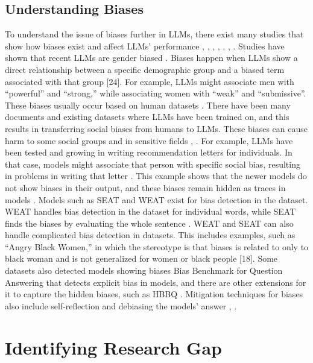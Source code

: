 \documentclass[twocolumn]{article}
\begin{document}
\subsection{Understanding Biases}
To understand the issue of biases further in LLMs, there exist many studies that show how biases exist and affect LLMs’ performance \cite{gallegos2024selfdebiasing}, \cite{may2019measuring}, \cite{scherrer2023gender}, \cite{thong2020biasaware}, \cite{anderson2024bias}, \cite{anantaprayoon2025intentaware}, \cite{pan2025beneath}. Studies have shown that recent LLMs are gender biased \cite{scherrer2023gender}. Biases happen when LLMs show a direct relationship between a specific demographic group and a biased term associated with that group [24]. For example, LLMs might associate men with “powerful” and “strong,” while associating women with “weak” and “submissive”. These biases usually occur based on human datasets \cite{gallegos2024selfdebiasing}. There have been many documents and existing datasets where LLMs have been trained on, and this results in transferring social biases from humans to LLMs. These biases can cause harm to some social groups and in sensitive fields \cite{scherrer2023gender}, \cite{pan2025beneath}. For example, LLMs have been tested and growing in writing recommendation letters for individuals. In that case, models might associate that person with specific social bias, resulting in problems in writing that letter \cite{pan2025beneath}. This example shows that the newer models do not show biases in their output, and these biases remain hidden as traces in models \cite{pan2025beneath}. Models such as SEAT and WEAT exist for bias detection in the dataset. WEAT handles bias detection in the dataset for individual words, while SEAT finds the biases by evaluating the whole sentence \cite{may2019measuring}. WEAT and SEAT can also handle complicated bias detection in datasets. This includes examples, such as “Angry Black Women,” in which the stereotype is that biases is related to only to black woman and is not generalized for women or black people [18]. Some datasets also detected models showing biases Bias Benchmark for Question Answering that detects explicit bias in models, and there are other extensions for it to capture the hidden biases, such as HBBQ \cite{pan2025beneath}. Mitigation techniques for biases also include self-reflection and debiasing the models’ answer \cite{gallegos2024selfdebiasing}, \cite{may2019measuring}.
\section{Identifying Research Gap}
\end{document}
